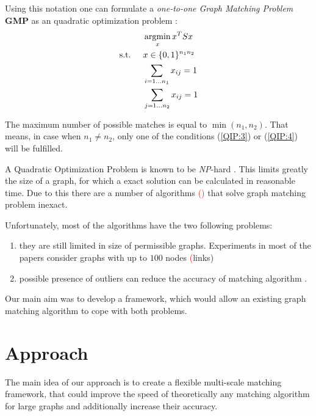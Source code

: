 \documentclass[
	fontsize=12pt,
	paper=a4,
	twoside=false,
	numbers=noenddot,
	plainheadsepline,
	toc=listof,
	toc=bibliography
]{scrartcl}
\def\argmax{\mathop{\rm argmax}}						%
\def\argmax{\mathop{\rm argmin}}						%
\newcommand\ToDo[1]{\textcolor{red}{#1}}
\begin{document}
Using this notation one can formulate a \emph{one-to-one Graph Matching Problem} \textbf{GMP} as an quadratic optimization problem \cite{Cho2014_Haystack, Cho2010_RRWM, Cho2012_ProgressiveGM, Conte2004}: 
\begin{alignat}{2}
    &     && \argmax_x{x^TSx}                           \notag\\
    & \text{s.t. } &&  x\in \{0,1\}^{n_1n_2}            \label{QIP:2}\\
    &             &&  \sum_{i=1\dots n_1} x_{ij} = 1    \label{QIP:3}\\
    &             &&  \sum_{j=1\dots n_2} x_{ij} = 1    \label{QIP:4}
 \end{alignat}
 
The maximum number of possible matches is equal to $\min(n_1, n_2)$. That means, in case when $n_1\not = n_2$, only one of the conditions (\ref{QIP:3}) or (\ref{QIP:4}) will be fulfilled.

A Quadratic Optimization Problem is known to be \emph{NP}-hard \cite{Sahni1974}. This limits greatly the size of a graph, for which a exact solution can be calculated in reasonable time. Due to this there are a number of algorithms \ToDo{()} that solve graph matching problem inexact.

Unfortunately, most of the algorithms have the two following problems:
\begin{enumerate}
\item they are still limited in size of permissible graphs. Experiments in most of the papers consider graphs with up to $100$ nodes \ToDo(links)
\item possible presence of outliers can reduce the accuracy of matching algorithm \cite{Suh_CVPR2015}.
\end{enumerate}  

Our main aim was to develop a framework, which would allow an existing graph matching algorithm to cope with both problems.


\section{Approach}

The main idea of our approach is to create a flexible multi-scale matching framework, that could improve the speed of
theoretically any matching algorithm for large graphs and additionally increase their accuracy. 
\end{document}
